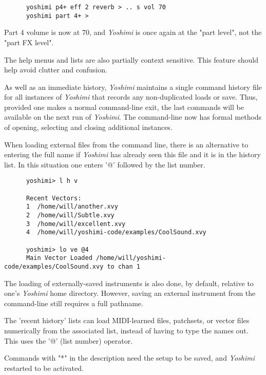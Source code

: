    \begin{verbatim}
      yoshimi p4+ eff 2 reverb > .. s vol 70
      yoshimi part 4+ >
   \end{verbatim}

   Part 4 volume is now at 70, and \textsl{Yoshimi} is once again at the
   "part level", not the "part FX level".

   The help menus and lists are also partially context sensitive. This
   feature should help avoid clutter and confusion.

   As well as an immediate history, \textsl{Yoshimi} maintains a single command
   history file for all instances of \textsl{Yoshimi} that records any
   non-duplicated loads or save.  Thus, provided one makes a normal
   command-line exit, the last commands will be available on the next run of
   \textsl{Yoshimi}.
   The command-line now has formal methods of opening, selecting and closing
   additional instances.

   When loading external files from the command line, there is an alternative
   to entering the full name if \textsl{Yoshimi} has already seen this file and
   it is in the history list. In this situation one enters '@' followed by the
   list number.

   \begin{verbatim}
      yoshimi> l h v

      Recent Vectors:
      1  /home/will/another.xvy
      2  /home/will/Subtle.xvy
      3  /home/will/excellent.xvy
      4  /home/will/yoshimi-code/examples/CoolSound.xvy

      yoshimi> lo ve @4
      Main Vector Loaded /home/will/yoshimi-code/examples/CoolSound.xvy to chan 1
   \end{verbatim}

   The loading of externally-saved instruments is also done, by default,
   relative to one's \textsl{Yoshimi} home directory.  However, saving an
   external instrument from the command-line still requires a full pathname.

   The 'recent history' lists can load MIDI-learned files, patchsets, or
   vector files numerically from the associated list,
   instead of having to type the names out.
   This uses the '@' (list number) operator.

   Commands with "*" in the description need the setup to be saved,
   and \textsl{Yoshimi} restarted to be activated.

